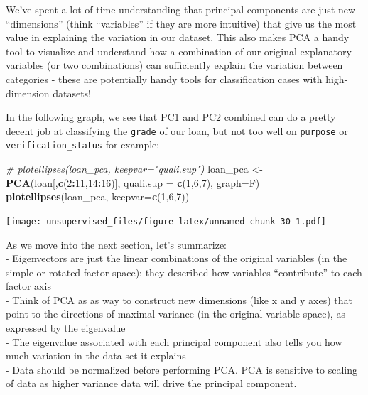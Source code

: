 \documentclass[]{article}
\newenvironment{Shaded}{\begin{snugshade}}{\end{snugshade}}
\newcommand{\CommentTok}[1]{\textcolor[rgb]{0.56,0.35,0.01}{\textit{#1}}}
\newcommand{\DataTypeTok}[1]{\textcolor[rgb]{0.13,0.29,0.53}{#1}}
\newcommand{\DecValTok}[1]{\textcolor[rgb]{0.00,0.00,0.81}{#1}}
\newcommand{\KeywordTok}[1]{\textcolor[rgb]{0.13,0.29,0.53}{\textbf{#1}}}
\newcommand{\NormalTok}[1]{#1}
\newcommand{\OperatorTok}[1]{\textcolor[rgb]{0.81,0.36,0.00}{\textbf{#1}}}
\newcommand{\StringTok}[1]{\textcolor[rgb]{0.31,0.60,0.02}{#1}}
\begin{document}
We've spent a lot of time understanding that principal components are
just new ``dimensions'' (think ``variables'' if they are more intuitive)
that give us the most value in explaining the variation in our dataset.
This also makes PCA a handy tool to visualize and understand how a
combination of our original explanatory variables (or two combinations)
can sufficiently explain the variation between categories - these are
potentially handy tools for classification cases with high-dimension
datasets!

In the following graph, we see that PC1 and PC2 combined can do a pretty
decent job at classifying the \texttt{grade} of our loan, but not too
well on \texttt{purpose} or \texttt{verification\_status} for example:

\begin{Shaded}
\begin{Highlighting}[]
\CommentTok{# plotellipses(loan_pca, keepvar="quali.sup")}
\NormalTok{loan_pca <-}\StringTok{ }\KeywordTok{PCA}\NormalTok{(loan[,}\KeywordTok{c}\NormalTok{(}\DecValTok{2}\OperatorTok{:}\DecValTok{11}\NormalTok{,}\DecValTok{14}\OperatorTok{:}\DecValTok{16}\NormalTok{)], }\DataTypeTok{quali.sup =} \KeywordTok{c}\NormalTok{(}\DecValTok{1}\NormalTok{,}\DecValTok{6}\NormalTok{,}\DecValTok{7}\NormalTok{), }\DataTypeTok{graph=}\NormalTok{F)}
\KeywordTok{plotellipses}\NormalTok{(loan_pca, }\DataTypeTok{keepvar=}\KeywordTok{c}\NormalTok{(}\DecValTok{1}\NormalTok{,}\DecValTok{6}\NormalTok{,}\DecValTok{7}\NormalTok{))}
\end{Highlighting}
\end{Shaded}

\texttt{[image: unsupervised\_files/figure-latex/unnamed-chunk-30-1.pdf]}

As we move into the next section, let's summarize:\\
- Eigenvectors are just the linear combinations of the original
variables (in the simple or rotated factor space); they described how
variables ``contribute'' to each factor axis\\
- Think of PCA as as way to construct new dimensions (like x and y axes)
that point to the directions of maximal variance (in the original
variable space), as expressed by the eigenvalue\\
- The eigenvalue associated with each principal component also tells you
how much variation in the data set it explains\\
- Data should be normalized before performing PCA. PCA is sensitive to
scaling of data as higher variance data will drive the principal
component.
\end{document}
